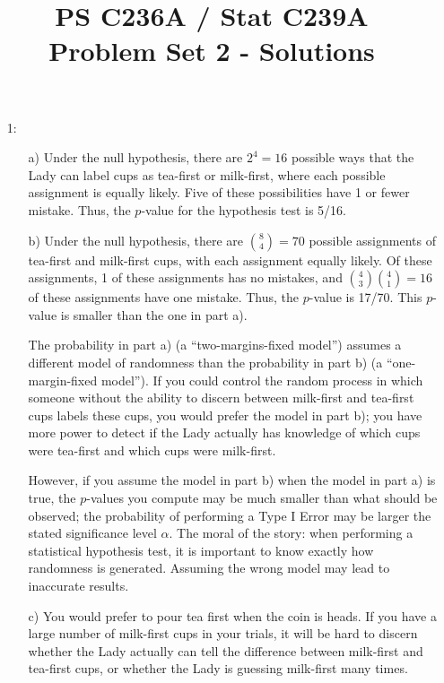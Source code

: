 \documentclass{article}
\title{PS C236A / Stat C239A \\ Problem Set 2 - Solutions}
\date{}
\begin{document}
\maketitle
\begin{itemize}
\item[1:]
\begin{itemize}
  \item[a)]  
    Under the null hypothesis, there are $2^4 = 16$ possible 
    ways that the Lady can label cups as tea-first or milk-first, where
    each possible assignment is equally likely.
    Five of these possibilities have 1 or fewer mistake.
    Thus, the $p$-value for the hypothesis test is 5/16.
  \item[b)] 
    Under the null hypothesis, there are $\binom{8}{4} = 70$ possible 
    assignments of tea-first and milk-first cups, with each assignment 
    equally likely.
    Of these assignments, 1 of these assignments has no mistakes, and
    $\binom4 3\binom 4 1 = 16 $ of these assignments have one mistake.
    Thus, the $p$-value is 17/70.  
    This $p$-value is smaller than the one in part a).
    
    The probability in part a) (a ``two-margins-fixed model'') assumes a different model 
    of randomness than the probability in part b) (a ``one-margin-fixed model'').  
    If you could control the random process in which someone without the ability to discern
    between milk-first and tea-first cups labels these cups,
    you would prefer the model in part b); 
    you have more power to detect if the Lady actually has knowledge of which cups were 
    tea-first and which cups were milk-first.
    
    However, if you assume the model in part b) when the model in part a) is true,
    the $p$-values you compute may be much smaller than what should be observed;
    the probability of performing a Type I Error may be larger the stated significance
    level $\alpha$.
    The moral of the story: when performing a statistical hypothesis test, it is important
    to know exactly how randomness is generated.  
    Assuming the wrong model may lead to inaccurate results.
  \item[c)]  
    You would prefer to pour tea first when the coin is heads.  
    If you have a large number of milk-first cups in your trials, 
    it will be hard to discern whether the Lady actually can tell the difference
    between milk-first and tea-first cups, or whether the Lady is guessing
    milk-first many times.
    

\end{itemize}
\end{itemize}
\end{document}

